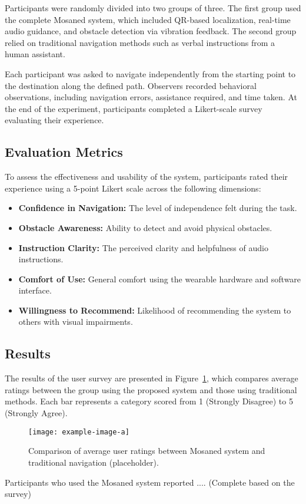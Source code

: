 Participants were randomly divided into two groups of three. The first group used the complete Mosaned system, which included QR-based localization, real-time audio guidance, and obstacle detection via vibration feedback. The second group relied on traditional navigation methods such as verbal instructions from a human assistant.

Each participant was asked to navigate independently from the starting point to the destination along the defined path. Observers recorded behavioral observations, including navigation errors, assistance required, and time taken. At the end of the experiment, participants completed a Likert-scale survey evaluating their experience.

\subsection{Evaluation Metrics}

To assess the effectiveness and usability of the system, participants rated their experience using a 5-point Likert scale across the following dimensions:

\begin{itemize}
	\item \textbf{Confidence in Navigation:} The level of independence felt during the task.
	\item \textbf{Obstacle Awareness:} Ability to detect and avoid physical obstacles.
	\item \textbf{Instruction Clarity:} The perceived clarity and helpfulness of audio instructions.
	\item \textbf{Comfort of Use:} General comfort using the wearable hardware and software interface.
	\item \textbf{Willingness to Recommend:} Likelihood of recommending the system to others with visual impairments.
\end{itemize}

\subsection{Results}

The results of the user survey are presented in Figure~\ref{fig:user_survey}, which compares average ratings between the group using the proposed system and those using traditional methods. Each bar represents a category scored from 1 (Strongly Disagree) to 5 (Strongly Agree).

\begin{figure}[h]
	\centering
	\texttt{[image: example-image-a]}
	\caption{Comparison of average user ratings between Mosaned system and traditional navigation (placeholder).}
	\label{fig:user_survey}
\end{figure}

Participants who used the Mosaned system reported .... (Complete based on the survey)
